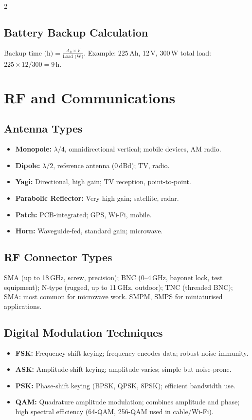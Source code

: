 \documentclass[10pt,a4paper]{article}
\begin{document}
\begin{multicols}{2}
\subsection{Battery Backup Calculation}
$\text{Backup time (h)} = \frac{A_h \times V}{\text{Load (W)}}$. Example: $225$\,Ah, 12\,V, 300\,W total load: $225 \times 12 / 300 = 9$\,h.

\section{RF and Communications}

\subsection{Antenna Types}
\begin{itemize}
\item \textbf{Monopole:} $\lambda/4$, omnidirectional vertical; mobile devices, AM radio.
\item \textbf{Dipole:} $\lambda/2$, reference antenna (0\,dBd); TV, radio.
\item \textbf{Yagi:} Directional, high gain; TV reception, point-to-point.
\item \textbf{Parabolic Reflector:} Very high gain; satellite, radar.
\item \textbf{Patch:} PCB-integrated; GPS, Wi-Fi, mobile.
\item \textbf{Horn:} Waveguide-fed, standard gain; microwave.
\end{itemize}

\subsection{RF Connector Types}
SMA (up to 18\,GHz, screw, precision); BNC (0--4\,GHz, bayonet lock, test equipment); N-type (rugged, up to 11\,GHz, outdoor); TNC (threaded BNC); SMA: most common for microwave work. SMPM, SMPS for miniaturised applications.

\subsection{Digital Modulation Techniques}
\begin{itemize}
\item \textbf{FSK:} Frequency-shift keying; frequency encodes data; robust noise immunity.
\item \textbf{ASK:} Amplitude-shift keying; amplitude varies; simple but noise-prone.
\item \textbf{PSK:} Phase-shift keying (BPSK, QPSK, 8PSK); efficient bandwidth use.
\item \textbf{QAM:} Quadrature amplitude modulation; combines amplitude and phase; high spectral efficiency (64-QAM, 256-QAM used in cable/Wi-Fi).
\end{itemize}


\end{multicols}
\end{document}
